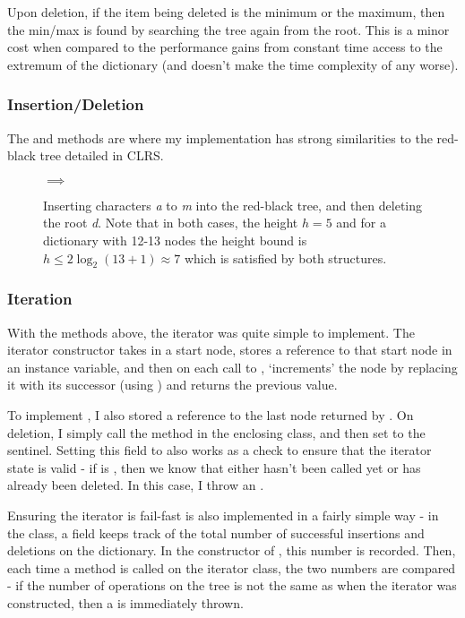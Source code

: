 Upon deletion, if the item being deleted is the minimum or the maximum, then the min/max is found by searching the tree again from the root. This is a minor cost when compared to the performance gains from constant time access to the extremum of the dictionary (and doesn't make the time complexity of  any worse).

\subsubsection{Insertion/Deletion} 
The  and  methods are where my implementation has strong similarities to the red-black tree detailed in CLRS.

\begin{figure}
\centering
{}
$\implies$
\caption{Inserting characters \textit{a} to \textit{m} into the red-black tree, and then deleting the root \textit{d}. Note that in both cases, the height $h = 5$ and for a dictionary with 12-13 nodes the height bound is $h \leq 2\log_2(13+1) \approx 7$ which is satisfied by both structures.}
\end{figure}

\subsubsection{Iteration}

With the methods above, the iterator was quite simple to implement. The iterator constructor takes in a start node, stores a reference to that start node in an instance variable, and then on each call to , `increments' the node by replacing it with its successor (using ) and returns the previous value.

To implement , I also stored a reference to the last node returned by . On deletion, I simply call the  method in the enclosing  class, and then set  to the  sentinel. Setting this field to  also works as a check to ensure that the iterator state is valid - if  is , then we know that either  hasn't been called yet or  has already been deleted. In this case, I throw an .

Ensuring the iterator is fail-fast is also implemented in a fairly simple way - in the  class, a field  keeps track of the total number of successful insertions and deletions on the dictionary. In the constructor of , this number is recorded. Then, each time a method is called on the iterator class, the two numbers are compared - if the number of operations on the tree is not the same as when the iterator was constructed, then a  is immediately thrown.